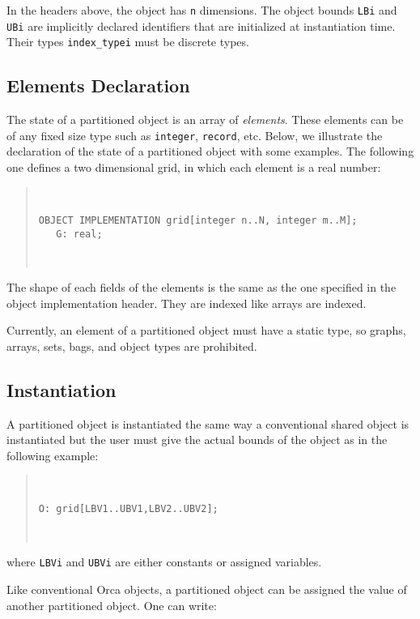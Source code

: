 \documentclass{article}
\newenvironment{example}
  {\begin{quote} ~\hrulefill }
  {~\hrulefill \end{quote} }
\begin{document}
In the headers above, the object has \verb+n+ dimensions. The object
bounds \verb+LBi+ and \verb+UBi+ are implicitly declared identifiers
that are initialized at instantiation time. Their types
\verb+index_typei+ must be discrete types.

\subsection{Elements Declaration}

The state of a partitioned object is an array of
\emph{elements}. These elements can be of any fixed size type such as
\verb+integer+, \verb+record+, etc. Below, we illustrate the
declaration of the state of a partitioned object with some
examples. The following one defines a two dimensional grid, in which
each element is a real number:

\begin{example} \begin{verbatim}
OBJECT IMPLEMENTATION grid[integer n..N, integer m..M]; 
   G: real; 
\end{verbatim} 
\end{example} 

The shape of each fields of the elements is the same as the one
specified in the object implementation header. They are indexed like
arrays are indexed.

Currently, an element of a partitioned object must have a static type,
so graphs, arrays, sets, bags, and object types are prohibited.

\subsection{Instantiation}

A partitioned object is instantiated the same way a conventional
shared object is instantiated but the user must give the actual bounds
of the object as in the following example:

\begin{example} \begin{verbatim}
O: grid[LBV1..UBV1,LBV2..UBV2];
\end{verbatim} 
\end{example}

where \verb+LBVi+ and \verb+UBVi+ are either constants or assigned
variables.
 
Like conventional Orca objects, a partitioned object can be assigned
the value of another partitioned object. One can write:
\end{document}

